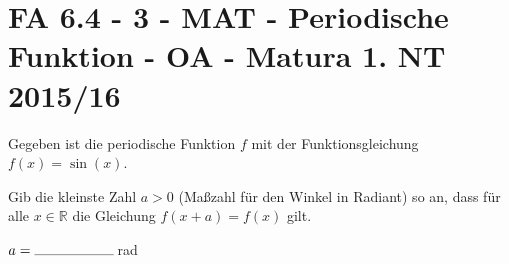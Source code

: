 \section{FA 6.4 - 3 - MAT - Periodische Funktion - OA - Matura 1. NT 2015/16}

\begin{beispiel}[FA 6.4]{1} %
Gegeben ist die periodische Funktion $f$ mit der Funktionsgleichung $f(x) = \sin(x)$. \leer

Gib die kleinste Zahl $a>0$ (Maßzahl für den Winkel in Radiant) so an, dass für alle $x\in \mathbb{R}$ die Gleichung $f(x+a)=f(x)$ gilt. \leer

$a=\rule{2cm}{0.3pt}$\,rad


\end{beispiel}